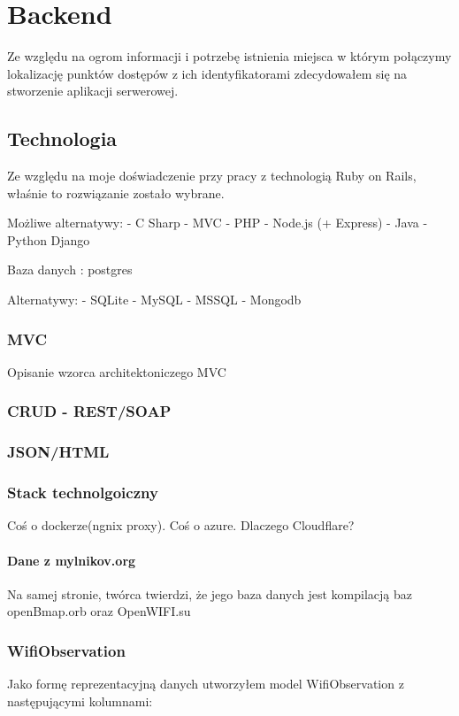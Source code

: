 \chapter{Backend}

Ze względu na ogrom informacji i potrzebę istnienia miejsca w którym połączymy lokalizację punktów dostępów z ich identyfikatorami zdecydowałem się na stworzenie aplikacji serwerowej. 

\section{Technologia}

Ze względu na moje doświadczenie przy pracy z technologią Ruby on Rails, właśnie to rozwiązanie zostało wybrane.

Możliwe alternatywy:
 - C Sharp - MVC
 - PHP
 - Node.js (+ Express)
 - Java
 - Python Django

Baza danych : postgres

Alternatywy:
 - SQLite
 - MySQL
 - MSSQL
 - Mongodb
 
 
\subsection{MVC}
Opisanie wzorca architektoniczego MVC

\subsection{CRUD - REST/SOAP}

\subsection{JSON/HTML}

\subsection{Stack technolgoiczny}
Coś o dockerze(ngnix proxy). Coś o azure. Dlaczego Cloudflare?



\subsubsection{Dane z mylnikov.org}

Na samej stronie, twórca twierdzi, że jego baza danych jest kompilacją baz openBmap.orb oraz OpenWIFI.su

\subsection{WifiObservation}
Jako formę reprezentacyjną danych utworzyłem model WifiObservation z następującymi kolumnami:

